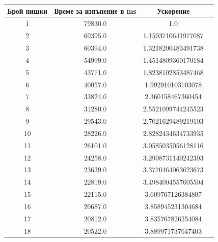 \begin{center}
 \begin{tabular}{||c c c c||} 
 \hline
 Брой нишки & Време за изпънение в ms & Ускорение \\ [0.5ex] 
 \hline
		\hline
			1 & 79830.0 & 1.0 \\
		

		\hline
			2 & 69395.0 & 1.1503710641977087 \\
		

		\hline
			3 & 60394.0 & 1.3218200483491738 \\
		

		\hline
			4 & 54999.0 & 1.4514809360170184 \\
		

		\hline
			5 & 43771.0 & 1.8238102853487468 \\
		

		\hline
			6 & 40057.0 & 1.992910103103078 \\
		

		\hline
			7 & 33824.0 & 2.360158467360454 \\
		

		\hline
			8 & 31280.0 & 2.5521099744245523 \\
		

		\hline
			9 & 29543.0 & 2.7021629489219103 \\
		

		\hline
			10 & 28226.0 & 2.8282434634733935 \\
		

		\hline
			11 & 26101.0 & 3.0585035056128116 \\
		

		\hline
			12 & 24258.0 & 3.2908731140242393 \\
		

		\hline
			13 & 23639.0 & 3.3770464063623673 \\
		

		\hline
			14 & 22819.0 & 3.4984004557605504 \\
		

		\hline
			15 & 22115.0 & 3.609767126384807 \\
		

		\hline
			16 & 20687.0 & 3.858945231304684 \\
		

		\hline
			17 & 20812.0 & 3.835767826254084 \\
		

		\hline
			18 & 20522.0 & 3.889971737647403 \\
		


\end{tabular}
\end{center}
